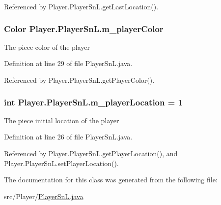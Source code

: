 Referenced by Player.\+Player\+Sn\+L.\+get\+Last\+Location().

\hypertarget{class_player_1_1_player_sn_l_a9fb98bcd7461b8b5a3193ecc8d00fcaa}{}
\subsubsection[{m\+\_\+player\+Color}]{\setlength{\rightskip}{0pt plus 5cm}Color Player.\+Player\+Sn\+L.\+m\+\_\+player\+Color}\label{class_player_1_1_player_sn_l_a9fb98bcd7461b8b5a3193ecc8d00fcaa}
The piece color of the player 

Definition at line 29 of file Player\+Sn\+L.\+java.



Referenced by Player.\+Player\+Sn\+L.\+get\+Player\+Color().

\hypertarget{class_player_1_1_player_sn_l_a9ff667423ca24b7b21b9775117156d68}{}
\subsubsection[{m\+\_\+player\+Location}]{\setlength{\rightskip}{0pt plus 5cm}int Player.\+Player\+Sn\+L.\+m\+\_\+player\+Location = 1}\label{class_player_1_1_player_sn_l_a9ff667423ca24b7b21b9775117156d68}
The piece initial location of the player 

Definition at line 26 of file Player\+Sn\+L.\+java.



Referenced by Player.\+Player\+Sn\+L.\+get\+Player\+Location(), and Player.\+Player\+Sn\+L.\+set\+Player\+Location().



The documentation for this class was generated from the following file\+:\begin{DoxyCompactItemize}
\item 
src/\+Player/\hyperlink{_player_sn_l_8java}{Player\+Sn\+L.\+java}\end{DoxyCompactItemize}
